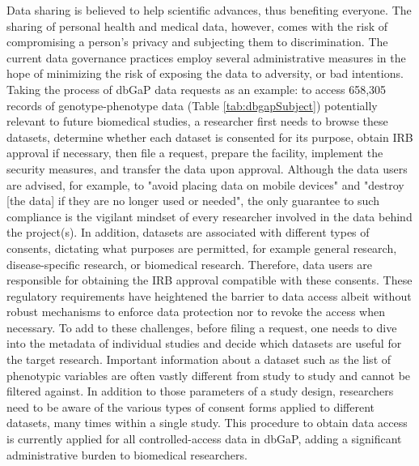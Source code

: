 \documentclass[letter]{bioinfo}
\begin{document}
	Data sharing is believed to help scientific advances, thus benefiting everyone. The sharing of personal health and medical data, however, comes with the risk of compromising a person's privacy and subjecting them to discrimination.  The current data governance practices employ several administrative measures in the hope of minimizing the risk of exposing the data to adversity, or bad intentions. Taking the process of dbGaP data requests as an example: to access 658,305 records of genotype-phenotype data (Table \ref{tab:dbgapSubject}) potentially relevant to future biomedical studies, a researcher first needs to browse these datasets, determine whether each dataset is consented for its purpose, obtain IRB approval if necessary, then file a request, prepare the facility, implement the security measures, and transfer the data upon approval. Although the data users are advised, for example, to "avoid placing data on mobile devices" and "destroy [the data] if they are no longer used or needed", the only guarantee to such compliance is the vigilant mindset of every researcher involved in the data behind the project(s).  In addition, datasets are associated with different types of consents, dictating what purposes are permitted, for example general research, disease-specific research, or biomedical research. Therefore, data users are responsible for obtaining the IRB approval compatible with these consents. These regulatory requirements have heightened the barrier to data access albeit without robust mechanisms to enforce data protection nor to revoke the access when necessary.  To add to these challenges, before filing a request, one needs to dive into the metadata of individual studies and decide which datasets are useful for the target research. Important information about a dataset such as the list of phenotypic variables are often vastly different from study to study and cannot be filtered against. In addition to those parameters of a study design, researchers need to be aware of the various types of consent forms applied to different datasets, many times within a single study. This procedure to obtain data access is currently applied for all controlled-access data in dbGaP, adding a significant administrative burden to biomedical researchers.
\end{document}

